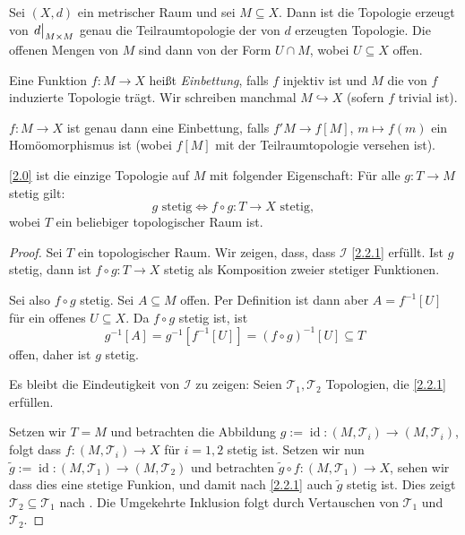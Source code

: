 \documentclass[
12pt, 
openany, 
a4paper, 
final,
fleqn, 
]{myclass}
\numberwithin{equation}{chapter}
\numberwithin{section}{chapter}
\newcommand{\varT}{\mathcal T}
\newcommand{\eval}[1]{\left. \vphantom{\int}#1\right\lvert}
\newcommand{\embed}{\hookrightarrow}
\DeclareMathOperator{\id}{id}
\begin{document}
\begin{rmk}
Sei $(X, d)$ ein metrischer Raum und sei $M\subseteq X$. Dann ist die Topologie erzeugt von $\eval{d}_{M\times M}$ genau die Teilraumtopologie der von $d$ erzeugten Topologie. Die offenen Mengen von $M$ sind dann von der Form $ U \cap M$, wobei $U\subseteq X$ offen.
\end{rmk}

\begin{defn}
Eine Funktion $f: M \to X$ heißt \emph{Einbettung}, falls $f$ injektiv ist und $M$ die von $f$ induzierte Topologie trägt. Wir schreiben manchmal $M \embed X$ (sofern $f$ trivial ist). 
\end{defn}

\begin{rmk}
$f:M\to X $ ist genau dann eine Einbettung, falls $f'M \to f[M]$, $m\mapsto f(m)$ ein Homöomorphismus ist (wobei $f[M]$ mit der Teilraumtopologie versehen ist). 
\end{rmk}

\begin{thr}\label{2.2}
\eqref{2.0} ist die einzige Topologie auf $M$ mit folgender Eigenschaft: Für alle $g: T\to M$ stetig gilt: 
\begin{equation}\label{2.2.1}
\text{$g$ stetig}\iff \text{$f\circ g: T\to X$ stetig, }
\end{equation}
wobei $T$ ein beliebiger topologischer Raum ist. 
\end{thr}

\begin{proof}
Sei $T$ ein topologischer Raum. 
Wir zeigen, dass, dass $\mathcal I$ \eqref{2.2.1} erfüllt. Ist $g$ stetig, dann ist $f\circ g: T \to X$ stetig als Komposition zweier stetiger Funktionen. 

Sei also $f\circ g$ stetig. Sei $A\subseteq M$ offen. Per Definition ist dann aber $A= f^{-1}[U]$ für ein offenes $U\subseteq X$. Da $f\circ g$ stetig ist, ist 
\[
g^{-1}[A] = g^{-1}[f^{-1}[U]] = (f \circ g)^{-1}[U] \subseteq T
\]
offen, daher ist $g$ stetig. 

Es bleibt die Eindeutigkeit von $\mathcal I$ zu zeigen: Seien $\varT_1, \varT_2$ Topologien, die \eqref{2.2.1} erfüllen. 

Setzen wir $T=M$ und betrachten die Abbildung $g:= \id: (M, \varT_i) \to (M, \varT_i)$, 
folgt dass $f: (M, \varT_i) \to X$ für $i=1,2$ stetig ist. Setzen wir nun $\tilde g:= \id: (M, \varT_1) \to (M, \varT_2)$ und betrachten $\tilde g \circ f: (M, \varT_1) \to X$, sehen wir dass dies eine stetige Funkion, und damit nach \eqref{2.2.1} auch $\tilde g$ stetig ist. Dies zeigt $\varT_2 \subseteq \varT_1$ nach . Die Umgekehrte Inklusion folgt durch Vertauschen von $\varT_1$ und $\varT_2$. 
\end{proof}
\end{document}
